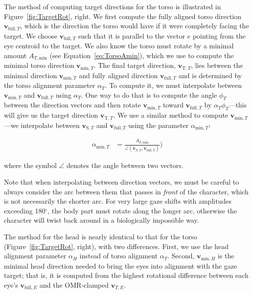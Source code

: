 The method of computing target directions for the torso is illustrated in Figure~\ref{fig:TargetRot}, right. We first compute the fully aligned torso direction $\mathbf{v}_{\mathrm{full},T}$, which is the direction the torso would have if it were completely facing the target. We choose $\mathbf{v}_{\mathrm{full},T}$ such that it is parallel to the vector $e$ pointing from the eye centroid to the target. We also know the torso must rotate by a minimal amount $A_{T,\mathrm{min}}$ (see Equation~\ref{eq:TorsoAmin}), which we use to compute the minimal torso direction $\mathbf{v}_{\mathrm{min},T}$. The final target direction, $\mathbf{v}_{\mathrm{T},T}$, lies between the minimal direction $\mathbf{v}_{\mathrm{min},T}$ and fully aligned direction $\mathbf{v}_{\mathrm{full},T}$ and is determined by the torso alignment parameter $\alpha_T$. To compute it, we must interpolate between $\mathbf{v}_{\mathrm{min},T}$ and $\mathbf{v}_{\mathrm{full},T}$ using $\alpha_T$. One way to do that is to compute the angle $\phi_T$ between the direction vectors and then rotate $\mathbf{v}_{\mathrm{min},T}$ toward $\mathbf{v}_{\mathrm{full},T}$ by $\alpha_T \phi_T$---this will give us the target direction $\mathbf{v}_{\mathrm{T},T}$. We use a similar method to compute $\mathbf{v}_{\mathrm{min},T}$---we interpolate between $\mathbf{v}_{\mathrm{S},T}$ and $\mathbf{v}_{\mathrm{full},T}$ using the parameter $\alpha_{\mathrm{min},T}$:

\begin{align}
\label{eq:TorsoMinRotParam}
\alpha_{\mathrm{min},T} &= \frac{A_{T,\mathrm{min}}}{\angle(\mathbf{v}_{S,T}, \mathbf{v}_{\mathrm{full},T})})
\end{align}

where the symbol $\angle$ denotes the angle between two vectors.

Note that when interpolating between direction vectors, we must be careful to always consider the arc between them that passes in \emph{front} of the character, which is not necessarily the shorter arc. For very large gaze shifts with amplitudes exceeding 180$^\circ$, the body part must rotate along the longer arc, otherwise the character will twist back around in a biologically impossible way.

The method for the head is nearly identical to that for the torso (Figure~\ref{fig:TargetRot}, right), with two differences. First, we use the head alignment parameter $\alpha_H$ instead of torso alignment $\alpha_T$. Second, $\mathbf{v}_{\mathrm{min},H}$ is the minimal head direction needed to bring the eyes into alignment with the gaze target; that is, it is computed from the highest rotational difference between each eye's $\mathbf{v}_{\mathrm{full},E}$ and the OMR-clamped $\mathbf{v}_{T,E}$.

